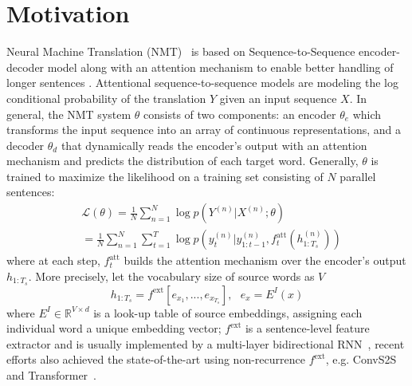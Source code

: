 \section{Motivation}
Neural Machine Translation
(NMT)~\cite{bahdanau2014neural,sutskever2014sequence}  is based on Sequence-to-Sequence encoder-decoder model along with an attention mechanism to enable better  handling of  longer sentences \cite{bahdanau2014neural}. Attentional sequence-to-sequence models are modeling the log conditional probability of the translation $Y$ given an input sequence $X$.  
In general, the NMT system $\theta$ consists of two components: an encoder $\theta_e$ which transforms the input sequence into an array of continuous representations,
and a decoder $\theta_d$ that dynamically reads the encoder's output with an attention mechanism and predicts the distribution of each target word. 
Generally, $\theta$ is trained to maximize the likelihood on a training set consisting of $N$ parallel sentences: 
\begin{equation}
	\begin{split}
	&\mathcal{L}\left(\theta\right)=\frac{1}{N}\sum_{n=1}^N\log p\left(Y^{(n)}|X^{(n)}; \theta\right) \\
    &=\frac{1}{N}\sum_{n=1}^N\sum_{t=1}^T\log p\left(y_t^{(n)}|y_{1:t-1}^{(n)}, f^{\text{att}}_t(h^{(n)}_{1:T_s})\right)
	\end{split}
	 \label{eq.loss} 
\end{equation}
where at each step, $f^{\text{att}}_t$ builds the attention mechanism over the encoder's output $h_{1: T_s}$.
More precisely, let the vocabulary size of source words as $V$
\begin{equation}
h_{1: T_s} = f^{\text{ext}}\left[e_{x_1},..., e_{x_{T_s}} \right], \ \ \ e_x = E^I(x)
\label{eq.encoder}
\end{equation}
where $E^I \in \mathbb{R}^{V \times d}$ is a look-up table of source embeddings, assigning each individual word a unique embedding vector; $f^{\text{ext}}$ is a sentence-level feature extractor and is usually implemented by a multi-layer bidirectional RNN~\cite{bahdanau2014neural,wu2016google}, recent efforts also achieved the state-of-the-art using non-recurrence $f^{\text{ext}}$, e.g. ConvS2S~\cite{gehring2017convolutional}  and Transformer~\cite{vaswani2017attention}.
